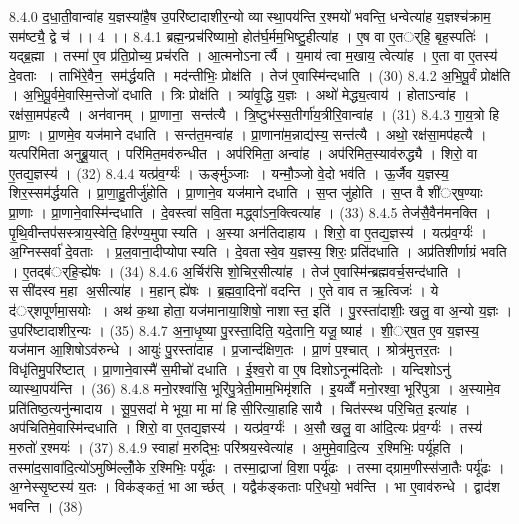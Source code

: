 8.4.0
द॒धा॒ती॒वान्वा॑ह य॒ज्ञस्या॑है॒ष उ॒परि॑ष्टादाशीर॒न्यो व्यास्था॒पय॑न्ति र॒श्मयो॑ भवन्ति॒ धन्वेत्या॑ह य॒ज्ञश्च॑क्राम॒ सम॑ष्ट्यै॒ द्वे च॑ ।। 4 ।।
8.4.1
ब्रह्म॒न्प्रच॑रिष्यामो॒ होत॑र्घ॒र्मम॒भिष्टु॒हीत्या॑ह । ए॒ष वा ए॒तर््हि॒ बृह॒स्पतिः॑ । यद्ब्र॒ह्मा । तस्मा॑ ए॒व प्र॑ति॒प्रोच्य॒ प्रच॑रति । आ॒त्मनोऽनार्त्यै । य॒माय॑ त्वा म॒खाय॒ त्वेत्या॑ह । ए॒ता वा ए॒तस्य॑ दे॒वताः । ताभि॑रे॒वैन॒ सम॑र्द्धयति । मद॑न्तीभिः॒ प्रोक्ष॑ति । तेज॑ ए॒वास्मि॑न्दधाति । (30)
8.4.2
अ॒भि॒पू॒र्वं प्रोक्ष॑ति । अ॒भि॒पू॒र्वमे॒वास्मि॒न्तेजो॑ दधाति । त्रिः प्रोक्ष॑ति । त्र्या॑वृ॒द्धि य॒ज्ञः । अथो॑ मेद्ध्य॒त्वाय॑ । होताऽन्वा॑ह । रक्ष॑सा॒मप॑हत्यै । अन॑वानम् । प्रा॒णाना॒ सन्त॑त्यै । त्रि॒ष्टुभ॑स्स॒तीर्गा॑य॒त्रीरि॒वान्वा॑ह । (31)
8.4.3
गा॒य॒त्रो हि प्रा॒णः । प्रा॒णमे॒व यज॑माने दधाति । सन्त॑त॒मन्वा॑ह । प्रा॒णाना॑म॒न्नाद्य॑स्य॒ सन्त॑त्यै । अथो॒ रक्ष॑सा॒मप॑हत्यै । यत्परि॑मिता अनुब्रू॒यात् । परि॑मित॒मव॑रुन्धीत । अप॑रिमिता॒ अन्वा॑ह । अप॑रिमित॒स्याव॑रुद्ध्यै । शिरो॒ वा ए॒तद्य॒ज्ञस्य॑ । (32)
8.4.4
यत्प्र॑व॒र्ग्यः॑ । ऊर्ङ्मुञ्जाः । यन्मौ॒ञ्जो वे॒दो भव॑ति । ऊ॒र्जैव य॒ज्ञस्य॒ शिर॒स्सम॑र्द्धयति । प्रा॒णा॒हु॒तीर्जु॑होति । प्रा॒णाने॒व यज॑माने दधाति । स॒प्त जु॑होति । स॒प्त वै शी॑र््ष॒ण्याः प्रा॒णाः । प्रा॒णाने॒वास्मि॑न्दधाति । दे॒वस्त्वा॑ सवि॒ता मद्ध्वा॑ऽन॒क्त्वित्या॑ह । (33)
8.4.5
तेज॑सै॒वैन॑मनक्ति । पृ॒थि॒वीन्तप॑सस्त्राय॒स्वेति॒ हिर॑ण्य॒मुपास्यति । अ॒स्या अन॑तिदाहाय । शिरो॒ वा ए॒तद्य॒ज्ञस्य॑ । यत्प्र॑व॒र्ग्यः॑ । अ॒ग्निस्सर्वा॑ दे॒वताः । प्र॒ल॒वाना॒दीप्योपास्यति । दे॒वतास्वे॒व य॒ज्ञस्य॒ शिरः॒ प्रति॑दधाति । अप्र॑तिशीर्णाग्रं भवति । ए॒तद्ब॑र््हि॒ऱ्ह्ये॑षः । (34)
8.4.6
अ॒र्चिर॑सि शो॒चिर॒सीत्या॑ह । तेज॑ ए॒वास्मि॑न्ब्रह्मवर्च॒सन्द॑धाति । ससी॑दस्व म॒हा अ॒सीत्या॑ह । म॒हान् ह्ये॑षः । ब्र॒ह्म॒वा॒दिनो॑ वदन्ति । ए॒ते वाव त ऋ॒त्विजः॑ । ये द॑र््शपूर्णमा॒सयोः । अथ॑ क॒था होता॒ यज॑मानाया॒शिषो॒ नाशास्त॒ इति॑ । पु॒रस्ता॑दाशीः॒ खलु॒ वा अ॒न्यो य॒ज्ञः । उ॒परि॑ष्टादाशीर॒न्यः । (35)
8.4.7
अ॒ना॒धृ॒ष्या पु॒रस्ता॒दिति॒ यदे॒तानि॒ यजू॒ष्याह॑ । शी॒र््ष॒त ए॒व य॒ज्ञस्य॒ यज॑मान आ॒शिषोऽव॑रुन्धे । आयुः॑ पु॒रस्ता॑दाह । प्र॒जान्द॑क्षिण॒तः । प्रा॒णं प॒श्चात् । श्रोत्र॑मुत्तर॒तः । विधृ॑तिमु॒परि॑ष्टात् । प्रा॒णाने॒वास्मै॑ स॒मीचो॑ दधाति । ई॒श्व॒रो वा ए॒ष दिशोऽनून्म॑दितोः । यन्दिशोऽनु॑ व्यास्था॒पय॑न्ति । (36)
8.4.8
मनो॒रश्वा॑सि॒ भूरि॑पु॒त्रेती॒माम॒भिमृ॑शति । इ॒यव्वैँ मनो॒रश्वा॒ भूरि॑पुत्रा । अ॒स्यामे॒व प्रति॑तिष्ठ॒त्यनु॑न्मादाय । सू॒प॒सदा॑ मे भूया॒ मा मा॑ हिसी॒रित्या॒हाहिसायै । चित॑स्स्थ परि॒चित॒ इत्या॑ह । अप॑चितिमे॒वास्मि॑न्दधाति । शिरो॒ वा ए॒तद्य॒ज्ञस्य॑ । यत्प्र॑व॒र्ग्यः॑ । अ॒सौ खलु॒ वा आ॑दि॒त्यः प्र॑व॒र्ग्यः॑ । तस्य॑ म॒रुतो॑ र॒श्मयः॑ । (37)
8.4.9
स्वाहा॑ म॒रुद्भिः॒ परि॑श्रय॒स्वेत्या॑ह । अ॒मुमे॒वादि॒त्य र॒श्मिभिः॒ पर्यू॑हति । तस्मा॑द॒सावा॑दि॒त्यो॑ऽमुष्मि॑ल्लोँ॒के र॒श्मिभिः॒ पर्यू॑ढः । तस्मा॒द्राजा॑ वि॒शा पर्यू॑ढः । तस्माद्ग्राम॒णीस्स॑जा॒तैः पर्यू॑ढः । अ॒ग्नेस्सृ॒ष्टस्य॑ य॒तः । विक॑ङ्कतं॒ भा आर्च्छत् । यद्वैक॑ङ्कताः परि॒धयो॒ भव॑न्ति । भा ए॒वाव॑रुन्धे । द्वाद॑श भवन्ति । (38)
